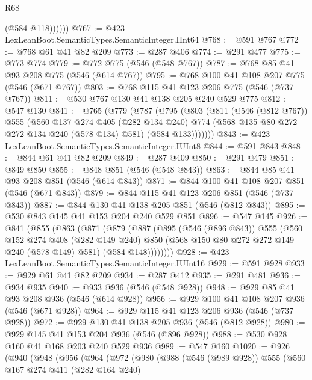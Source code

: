 \begin{lexlean}{R68}
\begin{coremodule}
              (@584 @118))))))
@767 := @423 LexLeanBoot.SemanticTypes.SemanticInteger.IInt64
@768 := @591 @767
@772 := @768 @61 @41 @82 @209
@773 := @287 @406
@774 := @291 @477
@775 := @773 @774
@779 := @772 @775 (@546 (@548 @767))
@787 := @768 @85 @41 @93 @208 @775 (@546 (@614 @767))
@795 := @768 @100 @41 @108 @207 @775 (@546 (@671 @767))
@803 := @768 @115 @41 @123 @206 @775 (@546 (@737 @767))
@811 := @530 @767 @130 @41 @138 @205 @240 @529 @775
@812 := @547 @130
@841 := @765
    (@779
      (@787
        (@795
          (@803
            (@811
              (@546 (@812 @767))
              @555
              (@560
                @137
                @274
                @405
                (@282 @134 @240)
                @774
                (@568 @135 @80 @272 @272 @134 @240 (@578 @134) @581)
                (@584 @133)))))))
@843 := @423 LexLeanBoot.SemanticTypes.SemanticInteger.IUInt8
@844 := @591 @843
@848 := @844 @61 @41 @82 @209
@849 := @287 @409
@850 := @291 @479
@851 := @849 @850
@855 := @848 @851 (@546 (@548 @843))
@863 := @844 @85 @41 @93 @208 @851 (@546 (@614 @843))
@871 := @844 @100 @41 @108 @207 @851 (@546 (@671 @843))
@879 := @844 @115 @41 @123 @206 @851 (@546 (@737 @843))
@887 := @844 @130 @41 @138 @205 @851 (@546 (@812 @843))
@895 := @530 @843 @145 @41 @153 @204 @240 @529 @851
@896 := @547 @145
@926 := @841
    (@855
      (@863
        (@871
          (@879
            (@887
              (@895
                (@546 (@896 @843))
                @555
                (@560
                  @152
                  @274
                  @408
                  (@282 @149 @240)
                  @850
                  (@568 @150 @80 @272 @272 @149 @240 (@578 @149) @581)
                  (@584 @148))))))))
@928 := @423 LexLeanBoot.SemanticTypes.SemanticInteger.IUInt16
@929 := @591 @928
@933 := @929 @61 @41 @82 @209
@934 := @287 @412
@935 := @291 @481
@936 := @934 @935
@940 := @933 @936 (@546 (@548 @928))
@948 := @929 @85 @41 @93 @208 @936 (@546 (@614 @928))
@956 := @929 @100 @41 @108 @207 @936 (@546 (@671 @928))
@964 := @929 @115 @41 @123 @206 @936 (@546 (@737 @928))
@972 := @929 @130 @41 @138 @205 @936 (@546 (@812 @928))
@980 := @929 @145 @41 @153 @204 @936 (@546 (@896 @928))
@988 := @530 @928 @160 @41 @168 @203 @240 @529 @936
@989 := @547 @160
@1020 := @926
    (@940
      (@948
        (@956
          (@964
            (@972
              (@980
                (@988
                  (@546 (@989 @928))
                  @555
                  (@560
                    @167
                    @274
                    @411
                    (@282 @164 @240)

\end{coremodule}
\end{lexlean}
